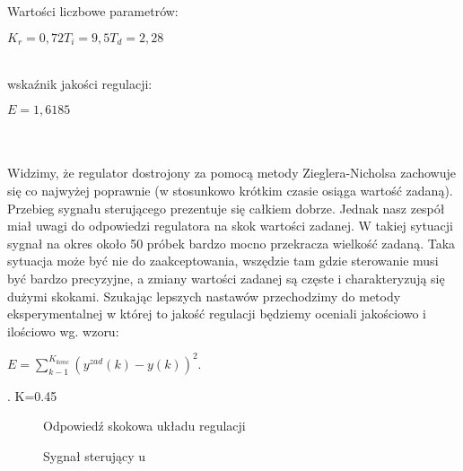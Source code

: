 Wartości liczbowe parametrów:
\begin{center}
$K_{r}=0,72 T_{i}=9,5 T_{d}=2,28$
\end{center}
~\\wskaźnik jakości regulacji:
\begin{center}
$E=1,6185$
\end{center}
~\\\\Widzimy, że regulator dostrojony za pomocą metody Zieglera-Nicholsa zachowuje się co najwyżej poprawnie (w stosunkowo krótkim czasie osiąga wartość zadaną). Przebieg sygnału sterującego prezentuje się całkiem dobrze. Jednak nasz zespół miał uwagi do odpowiedzi regulatora na skok wartości zadanej. W takiej sytuacji sygnał na okres około 50 próbek bardzo mocno przekracza wielkość zadaną. Taka sytuacja może być nie do zaakceptowania, wszędzie tam gdzie sterowanie musi być bardzo precyzyjne, a zmiany wartości zadanej są częste i charakteryzują się dużymi skokami. Szukając lepszych nastawów przechodzimy do metody eksperymentalnej w której to jakość regulacji będziemy oceniali jakościowo i ilościowo wg. wzoru:
\begin{center}
$E=\sum_{k-1}^{K_{konc}}(y^{zad}(k)-y(k))^{2}$.
\end{center}

. K=0.45
\begin{figure}[h]
    \centering
    \caption{Odpowiedź skokowa układu regulacji}
    \label{zad5_niegasnące_oscylacje}
\end{figure}

\begin{figure}[h]
    \centering
    \caption{Sygnał sterujący u}
    \label{zad2_stat_wykres}
\end{figure}
\FloatBarrier

